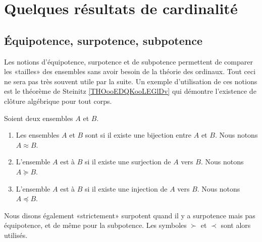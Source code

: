 
\section{Quelques résultats de cardinalité}

\subsection{Équipotence, surpotence, subpotence}

Les notions d'équipotence, surpotence et de subpotence permettent de comparer les «tailles» des ensembles sans avoir besoin de la théorie des ordinaux. Tout ceci ne sera pas très souvent utile par la suite. Un exemple d'utilisation de ces notions est le théorème de Steinitz \ref{THOooEDQKooLEGlDv} qui démontre l'existence de clôture algébrique pour tout corps.

\begin{definition}      \label{DEFooXGXZooIgcBCg}
	Soient deux ensembles \( A\) et \( B\).
	\begin{enumerate}
		\item
		      Les ensembles \( A\) et \( B\) sont  si il existe une bijection entre \( A\) et \( B\). Nous notons \( A\approx B\).
		\item
		      L'ensemble \( A\) est  à \( B\) si il existe une surjection de \( A\) vers \( B\). Nous notons \( A\succeq B\).
		\item
		      L'ensemble \( A\) est  à \( B\) si il existe une injection de \( A\) vers \( B\). Nous notons \( A\preceq B\).
	\end{enumerate}
	Nous disons également «strictement» surpotent quand il y a surpotence mais pas équipotence, et de même pour la subpotence. Les symboles \( \succ\) et \( \prec\) sont alors utilisés.
\end{definition}


